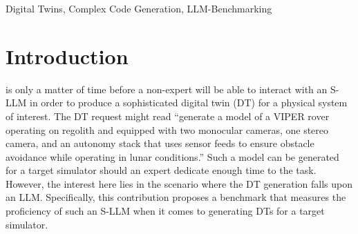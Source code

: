 \documentclass{ieeeaccess}
\begin{document}
\begin{keywords}
    Digital Twins, Complex Code Generation, LLM-Benchmarking\end{keywords}

\titlepgskip=-21pt

\maketitle

\section{Introduction}
\label{sec:introduction}

 is only a matter of time before a non-expert will be able to interact with an S-LLM in order to produce a sophisticated digital twin (DT) for a physical system of interest. The DT request might read ``generate a model of a VIPER rover operating on regolith and equipped with two monocular cameras, one stereo camera, and an autonomy stack that uses sensor feeds to ensure obstacle avoidance while operating in lunar conditions.'' Such a model can be generated for a target simulator should an expert dedicate enough time to the task. However, the interest here lies in the scenario where the DT generation falls upon an LLM. Specifically, this contribution proposes a benchmark that measures the proficiency of such an S-LLM when it comes to generating DTs for a target simulator. 
\end{document}
